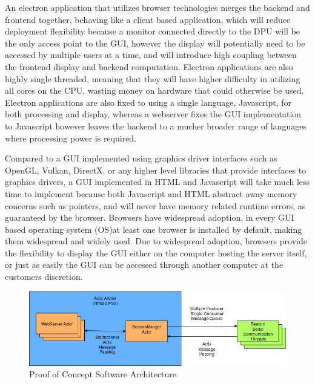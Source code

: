 \bigskip
An electron application that utilizes browser technologies merges the backend and frontend together, behaving like a client based application, which will reduce deployment flexibility because a monitor connected directly to the DPU will be the only access point to the GUI, however the display will potentially need to be accessed by multiple users at a time, and will introduce high coupling between the frontend display and backend computation.
Electron applications are also highly single threaded, meaning that they will have higher difficulty in utilizing all cores on the CPU, wasting money on hardware that could otherwise be used.
Electron applications are also fixed to using a single language, Javascript, for both processing and display, whereas a webserver fixes the GUI implementation to Javascript however leaves the backend to a mucher broader range of languages where processing power is required.

\pagebreak
Compared to a GUI implemented using graphics driver interfaces such as OpenGL, Vulkan, DirectX, or any higher level libraries that provide interfaces to graphics drivers, a GUI implemented in HTML and Javascript will take much less time to implement because both Javascript and HTML abstract away memory concerns such as pointers, and will never have memory related runtime errors, as guaranteed by the browser. Browsers have widespread adoption, in every GUI based operating system (\Gls{OS})at least one browser is installed by default, making them widespread and widely used.
Due to widespread adoption, browsers provide the flexibility to display the GUI either on the computer hosting the server itself, or just as easily the GUI can be accessed through another computer at the customers discretion.

\bigskip
\begin{figure}[H]
	\centering
    \includegraphics[scale=0.55]{images/poc_arch.png}
    \caption{Proof of Concept Software Architecture}
    \label{software_poc_arch}
\end{figure}

